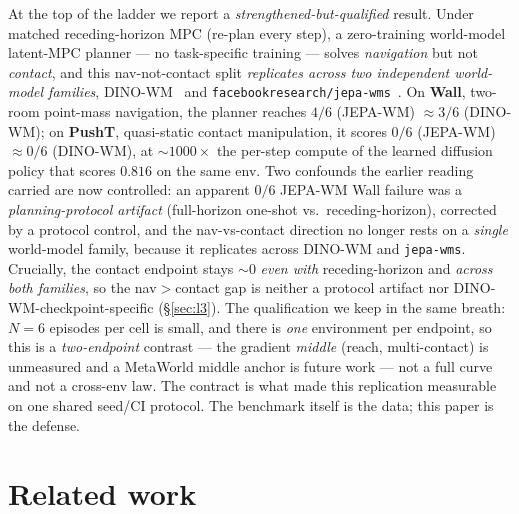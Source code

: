 \documentclass[10pt]{article}
\begin{document}
At the top of the ladder we report a \emph{strengthened-but-qualified}
result. Under matched receding-horizon MPC (re-plan every step), a
zero-training world-model latent-MPC planner --- no task-specific training
--- solves \emph{navigation} but not \emph{contact}, and this
nav-not-contact split \emph{replicates across two independent world-model
families}, DINO-WM~\cite{zhou2024dinowm} and
\texttt{facebookresearch/jepa-wms}~\cite{assran2025vjepa2}. On \textbf{Wall},
two-room point-mass navigation, the planner reaches $4/6$ (JEPA-WM)
$\approx 3/6$ (DINO-WM); on \textbf{PushT}, quasi-static contact
manipulation, it scores $0/6$ (JEPA-WM) $\approx 0/6$ (DINO-WM), at
${\sim}1000\times$ the per-step compute of the learned diffusion policy that
scores $0.816$ on the same env. Two confounds the earlier reading carried
are now controlled: an apparent $0/6$ JEPA-WM Wall failure was a
\emph{planning-protocol artifact} (full-horizon one-shot vs.\
receding-horizon), corrected by a protocol control, and the
nav-vs-contact direction no longer rests on a \emph{single} world-model
family, because it replicates across DINO-WM and \texttt{jepa-wms}.
Crucially, the contact endpoint stays ${\sim}0$ \emph{even with}
receding-horizon and \emph{across both families}, so the nav$>$contact gap
is neither a protocol artifact nor DINO-WM-checkpoint-specific
(\S\ref{sec:l3}). The qualification we keep in the same breath: $N{=}6$
episodes per cell is small, and there is \emph{one} environment per endpoint,
so this is a \emph{two-endpoint} contrast --- the gradient \emph{middle}
(reach, multi-contact) is unmeasured and a MetaWorld middle anchor is future
work --- not a full curve and not a cross-env law. The contract is what made
this replication measurable on one shared seed/CI protocol. The benchmark
itself is the data; this paper is the defense.


\section{Related work}
\label{sec:related}
\end{document}

